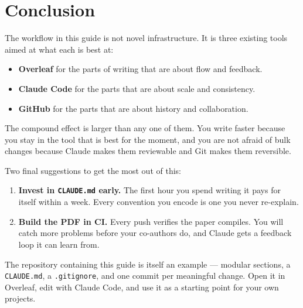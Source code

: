 \section{Conclusion}

The workflow in this guide is not novel infrastructure. It is three existing tools aimed at what each is best at:

\begin{itemize}[leftmargin=*]
  \item \textbf{Overleaf} for the parts of writing that are about flow and feedback.
  \item \textbf{Claude Code} for the parts that are about scale and consistency.
  \item \textbf{GitHub} for the parts that are about history and collaboration.
\end{itemize}

The compound effect is larger than any one of them. You write faster because you stay in the tool that is best for the moment, and you are not afraid of bulk changes because Claude makes them reviewable and Git makes them reversible.

Two final suggestions to get the most out of this:

\begin{enumerate}[leftmargin=*]
  \item \textbf{Invest in \texttt{CLAUDE.md} early.} The first hour you spend writing it pays for itself within a week. Every convention you encode is one you never re-explain.
  \item \textbf{Build the PDF in CI.} Every push verifies the paper compiles. You will catch more problems before your co-authors do, and Claude gets a feedback loop it can learn from.
\end{enumerate}

The repository containing this guide is itself an example --- modular sections, a \verb|CLAUDE.md|, a \verb|.gitignore|, and one commit per meaningful change. Open it in Overleaf, edit with Claude Code, and use it as a starting point for your own projects.
